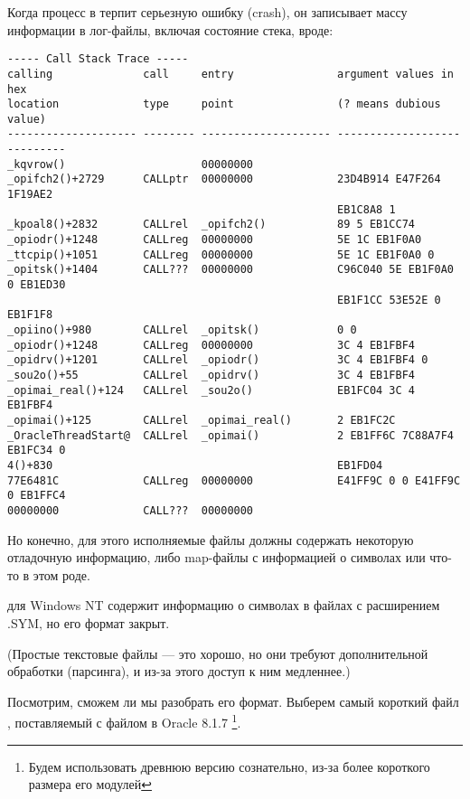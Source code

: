 \myindex{\oracle}
\label{Oracle_SYM_files_example}

Когда процесс в \oracle терпит серьезную ошибку (crash), он записывает массу информации в лог-файлы,
включая состояние стека, вроде:

\begin{lstlisting}
----- Call Stack Trace -----
calling              call     entry                argument values in hex      
location             type     point                (? means dubious value)     
-------------------- -------- -------------------- ----------------------------
_kqvrow()                     00000000             
_opifch2()+2729      CALLptr  00000000             23D4B914 E47F264 1F19AE2
                                                   EB1C8A8 1
_kpoal8()+2832       CALLrel  _opifch2()           89 5 EB1CC74
_opiodr()+1248       CALLreg  00000000             5E 1C EB1F0A0
_ttcpip()+1051       CALLreg  00000000             5E 1C EB1F0A0 0
_opitsk()+1404       CALL???  00000000             C96C040 5E EB1F0A0 0 EB1ED30
                                                   EB1F1CC 53E52E 0 EB1F1F8
_opiino()+980        CALLrel  _opitsk()            0 0
_opiodr()+1248       CALLreg  00000000             3C 4 EB1FBF4
_opidrv()+1201       CALLrel  _opiodr()            3C 4 EB1FBF4 0
_sou2o()+55          CALLrel  _opidrv()            3C 4 EB1FBF4
_opimai_real()+124   CALLrel  _sou2o()             EB1FC04 3C 4 EB1FBF4
_opimai()+125        CALLrel  _opimai_real()       2 EB1FC2C
_OracleThreadStart@  CALLrel  _opimai()            2 EB1FF6C 7C88A7F4 EB1FC34 0
4()+830                                            EB1FD04
77E6481C             CALLreg  00000000             E41FF9C 0 0 E41FF9C 0 EB1FFC4
00000000             CALL???  00000000             
\end{lstlisting}

Но конечно, для этого исполняемые файлы \oracle должны содержать некоторую отладочную информацию,
либо map-файлы с информацией о символах или что-то в этом роде.

\oracle для Windows NT содержит информацию о символах в файлах с расширением .SYM, но его формат закрыт.

(Простые текстовые файлы --- это хорошо, но они требуют дополнительной обработки (парсинга), и из-за этого доступ
к ним медленнее.)

Посмотрим, сможем ли мы разобрать его формат.
Выберем самый короткий файл , поставляемый с файлом  в Oracle 8.1.7
\footnote{Будем использовать древнюю версию \oracle сознательно, из-за более короткого размера его модулей}.

